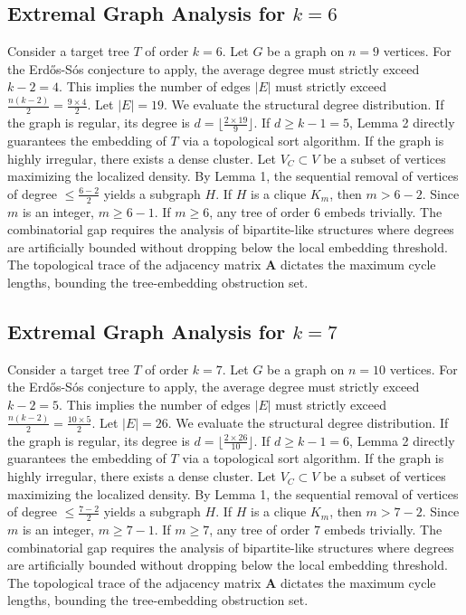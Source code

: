 \documentclass[11pt,a4paper]{article}
\begin{document}
\subsection{Extremal Graph Analysis for $k=6$}
Consider a target tree $T$ of order $k=6$.
Let $G$ be a graph on $n=9$ vertices.
For the Erd\H{o}s-S\'os conjecture to apply, the average degree must strictly exceed $k-2 = 4$.
This implies the number of edges $|E|$ must strictly exceed $\frac{n(k-2)}{2} = \frac{9 \times 4}{2}$.
Let $|E| = 19$.
We evaluate the structural degree distribution. If the graph is regular, its degree is $d = \lfloor \frac{2 \times 19}{9} \rfloor$.
If $d \geq k-1 = 5$, Lemma 2 directly guarantees the embedding of $T$ via a topological sort algorithm.
If the graph is highly irregular, there exists a dense cluster. Let $V_C \subset V$ be a subset of vertices maximizing the localized density.
By Lemma 1, the sequential removal of vertices of degree $\leq \frac{6-2}{2}$ yields a subgraph $H$.
If $H$ is a clique $K_{m}$, then $m > 6-2$. Since $m$ is an integer, $m \geq 6-1$. If $m \geq 6$, any tree of order $6$ embeds trivially.
The combinatorial gap requires the analysis of bipartite-like structures where degrees are artificially bounded without dropping below the local embedding threshold. The topological trace of the adjacency matrix $\mathbf{A}$ dictates the maximum cycle lengths, bounding the tree-embedding obstruction set.


\subsection{Extremal Graph Analysis for $k=7$}
Consider a target tree $T$ of order $k=7$.
Let $G$ be a graph on $n=10$ vertices.
For the Erd\H{o}s-S\'os conjecture to apply, the average degree must strictly exceed $k-2 = 5$.
This implies the number of edges $|E|$ must strictly exceed $\frac{n(k-2)}{2} = \frac{10 \times 5}{2}$.
Let $|E| = 26$.
We evaluate the structural degree distribution. If the graph is regular, its degree is $d = \lfloor \frac{2 \times 26}{10} \rfloor$.
If $d \geq k-1 = 6$, Lemma 2 directly guarantees the embedding of $T$ via a topological sort algorithm.
If the graph is highly irregular, there exists a dense cluster. Let $V_C \subset V$ be a subset of vertices maximizing the localized density.
By Lemma 1, the sequential removal of vertices of degree $\leq \frac{7-2}{2}$ yields a subgraph $H$.
If $H$ is a clique $K_{m}$, then $m > 7-2$. Since $m$ is an integer, $m \geq 7-1$. If $m \geq 7$, any tree of order $7$ embeds trivially.
The combinatorial gap requires the analysis of bipartite-like structures where degrees are artificially bounded without dropping below the local embedding threshold. The topological trace of the adjacency matrix $\mathbf{A}$ dictates the maximum cycle lengths, bounding the tree-embedding obstruction set.
\end{document}
